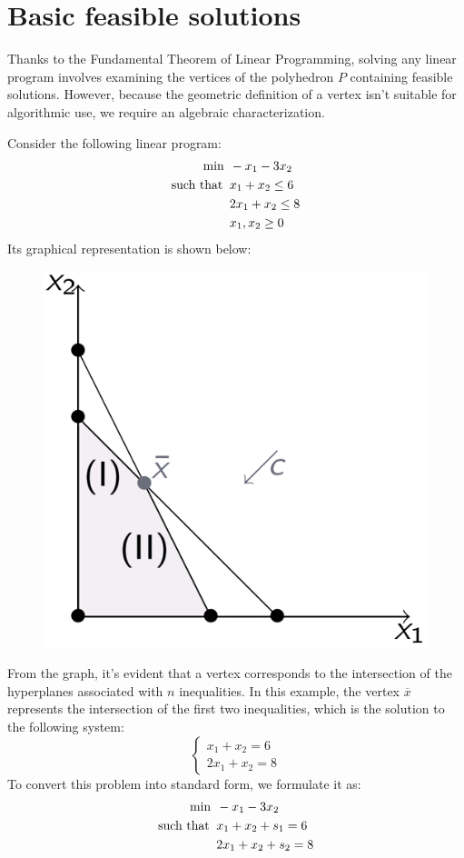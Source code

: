 \section{Basic feasible solutions}

Thanks to the Fundamental Theorem of Linear Programming, solving any linear program involves examining the vertices of the polyhedron $P$ containing feasible solutions.
However, because the geometric definition of a vertex isn't suitable for algorithmic use, we require an algebraic characterization.
\begin{example}
    Consider the following linear program:
    \begin{align*}
        \min                      \:&\: -x_1-3x_2          \\
        \textnormal{such that }     &\: x_1+x_2 \leq 6  \\
                                    &\: 2x_1+x_2 \leq 8  \\
                                    &\: x_1,x_2 \geq 0
    \end{align*}
    Its graphical representation is shown below:
    \begin{figure}[H]
        \centering
        \includegraphics[width=0.25\linewidth]{images/lp.png}
    \end{figure}
    From the graph, it's evident that a vertex corresponds to the intersection of the hyperplanes associated with $n$ inequalities. 
    In this example, the vertex $\overline{x}$ represents the intersection of the first two inequalities, which is the solution to the following system:
    \[
    \begin{cases}
        x_1+x_2=6 \\
        2x_1+x_2=8
    \end{cases}
    \]
    To convert this problem into standard form, we formulate it as:
    \begin{align*}
        \min                      \:&\: -x_1-3x_2          \\
        \textnormal{such that }     &\: x_1+x_2+s_1 = 6  \\
                                    &\: 2x_1+x_2+s_2 = 8  \\

\end{align*}
\end{example}
